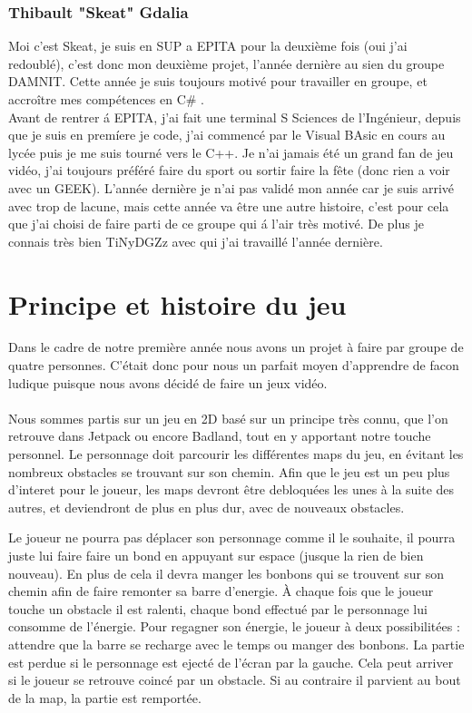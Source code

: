 \documentclass [11pt]{report}
\begin{document}
	
		
		
		\subsection {Thibault "Skeat" Gdalia}

			Moi c'est Skeat, je suis en SUP a EPITA pour la deuxi\`eme fois (oui j'ai redoubl\'e),  c'est donc mon deuxi\`eme projet, l'ann\'ee derni\`ere au sien du groupe DAMNIT. Cette ann\'ee je suis toujours motiv\'e pour travailler en groupe, et accro\^itre mes comp\'etences en C\# . 
			\\ \indent  Avant de rentrer \'a EPITA, j'ai fait une terminal S Sciences de l'Ing\'enieur, depuis que je suis en prem\'iere je code, j'ai commenc\'e par le Visual BAsic en cours au lyc\'ee puis je me suis tourn\'e vers le C++. Je n'ai jamais \'et\'e un grand fan de jeu vid\'eo, j'ai toujours pr\'ef\'er\'e faire du sport ou sortir faire la f\^ete (donc rien a voir avec un GEEK). L'ann\'ee derni\`ere je n'ai pas valid\'e mon ann\'ee car je suis arriv\'e avec trop de lacune, mais cette ann\'ee va \^etre une autre histoire, c'est pour cela que j'ai choisi de faire parti de ce groupe qui \'a l'air tr\`es motiv\'e. De plus je connais tr\`es bien TiNyDGZz avec qui j'ai travaill\'e l'ann\'ee derni\`ere.\\\vspace{10mm}
	
	

\chapter{Principe et histoire du jeu}
	Dans le cadre de notre première année nous avons un projet à faire par groupe de quatre personnes. C'était donc pour nous un parfait moyen d'apprendre de facon ludique puisque nous avons décidé de faire un jeux vidéo.\\\\

\indent Nous sommes partis sur un jeu en 2D bas\'e sur un principe tr\`es connu, que l'on retrouve dans Jetpack ou encore Badland, tout en y apportant notre touche personnel. Le personnage doit parcourir les différentes maps du jeu, en évitant les nombreux obstacles se trouvant sur son chemin. Afin que le jeu est un peu plus d'interet pour le joueur, les maps devront être debloquées les unes à la suite des autres, et deviendront de plus en plus dur, avec de nouveaux obstacles.

\indent Le joueur ne pourra pas déplacer son personnage comme il le souhaite, il pourra juste lui faire faire un bond en appuyant sur espace (jusque la rien de bien nouveau). En plus de cela il devra manger les bonbons qui se trouvent sur son chemin afin de faire remonter sa barre d'energie. \`A chaque fois que le joueur touche un obstacle il est ralenti, chaque bond effectué par le personnage lui consomme de l'énergie. Pour regagner son énergie, le joueur à deux possibilitées : attendre que la barre se recharge avec le temps ou manger des bonbons. La partie est perdue si le personnage est ejecté de l'écran par la gauche. Cela peut arriver si le joueur se retrouve coincé par un obstacle. Si au contraire il parvient au bout de la map, la partie est remportée.
\newpage 
\end{document}
